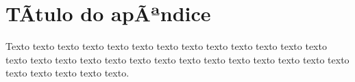 \chapter{TÃ­tulo do apÃªndice}
\label{cap:ape}

Texto texto texto texto texto texto texto texto texto texto texto texto texto
texto texto texto texto texto texto texto texto texto texto texto texto texto
texto texto texto texto texto texto.


